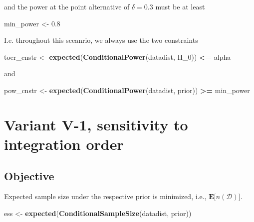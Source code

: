 \documentclass[]{book}
\newenvironment{Shaded}{\begin{snugshade}}{\end{snugshade}}
\newcommand{\DecValTok}[1]{\textcolor[rgb]{0.00,0.00,0.81}{#1}}
\newcommand{\FloatTok}[1]{\textcolor[rgb]{0.00,0.00,0.81}{#1}}
\newcommand{\KeywordTok}[1]{\textcolor[rgb]{0.13,0.29,0.53}{\textbf{#1}}}
\newcommand{\NormalTok}[1]{#1}
\newcommand{\OperatorTok}[1]{\textcolor[rgb]{0.81,0.36,0.00}{\textbf{#1}}}
\newcommand{\StringTok}[1]{\textcolor[rgb]{0.31,0.60,0.02}{#1}}
\begin{document}
and the power at the point alternative of \(\delta=0.3\) must
be at least

\begin{Shaded}
\begin{Highlighting}[]
\NormalTok{min_power <-}\StringTok{ }\FloatTok{0.8}
\end{Highlighting}
\end{Shaded}

I.e. throughout this sceanrio, we always use the two
constraints

\begin{Shaded}
\begin{Highlighting}[]
\NormalTok{toer_cnstr <-}\StringTok{ }\KeywordTok{expected}\NormalTok{(}\KeywordTok{ConditionalPower}\NormalTok{(datadist, H_}\DecValTok{0}\NormalTok{)) }\OperatorTok{<=}\StringTok{ }\NormalTok{alpha}
\end{Highlighting}
\end{Shaded}

and

\begin{Shaded}
\begin{Highlighting}[]
\NormalTok{pow_cnstr <-}\StringTok{ }\KeywordTok{expected}\NormalTok{(}\KeywordTok{ConditionalPower}\NormalTok{(datadist, prior)) }\OperatorTok{>=}\StringTok{ }\NormalTok{min_power}
\end{Highlighting}
\end{Shaded}

\hypertarget{variantV_1}{%
\section{Variant V-1, sensitivity to integration order}\label{variantV_1}}

\hypertarget{objective-10}{%
\subsection{Objective}\label{objective-10}}

Expected sample size under the respective prior is minimized, i.e.,
\(\boldsymbol{E}\big[n(\mathcal{D})\big]\).

\begin{Shaded}
\begin{Highlighting}[]
\NormalTok{ess <-}\StringTok{ }\KeywordTok{expected}\NormalTok{(}\KeywordTok{ConditionalSampleSize}\NormalTok{(datadist, prior))}
\end{Highlighting}
\end{Shaded}
\end{document}
